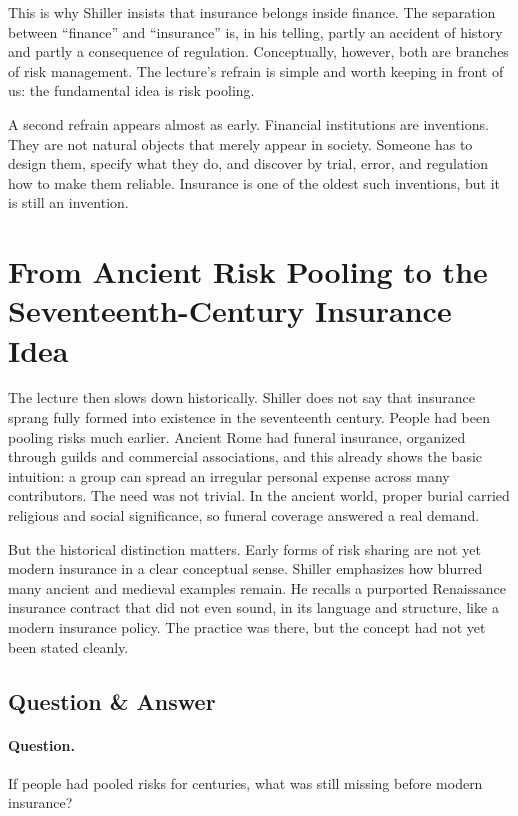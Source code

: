 This is why Shiller insists that insurance belongs inside finance. The separation between ``finance'' and ``insurance'' is, in his telling, partly an accident of history and partly a consequence of regulation. Conceptually, however, both are branches of risk management. The lecture's refrain is simple and worth keeping in front of us: the fundamental idea is risk pooling.

A second refrain appears almost as early. Financial institutions are inventions. They are not natural objects that merely appear in society. Someone has to design them, specify what they do, and discover by trial, error, and regulation how to make them reliable. Insurance is one of the oldest such inventions, but it is still an invention.

\section{From Ancient Risk Pooling to the Seventeenth-Century Insurance Idea}

The lecture then slows down historically. Shiller does not say that insurance sprang fully formed into existence in the seventeenth century. People had been pooling risks much earlier. Ancient Rome had funeral insurance, organized through guilds and commercial associations, and this already shows the basic intuition: a group can spread an irregular personal expense across many contributors. The need was not trivial. In the ancient world, proper burial carried religious and social significance, so funeral coverage answered a real demand.

But the historical distinction matters. Early forms of risk sharing are not yet modern insurance in a clear conceptual sense. Shiller emphasizes how blurred many ancient and medieval examples remain. He recalls a purported Renaissance insurance contract that did not even sound, in its language and structure, like a modern insurance policy. The practice was there, but the concept had not yet been stated cleanly.

\subsection{Question \& Answer}

\paragraph{Question.} If people had pooled risks for centuries, what was still missing before modern insurance?


